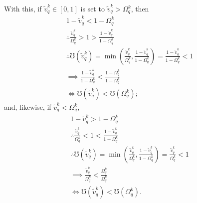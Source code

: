 \documentclass[hidelinks, nonatbib]{elsarticle}
\begin{document}
\begin{enumerate}
    With this, if $\tilde{v}_{q}^{k} \in [0,1]$ is set to $\tilde{v}_{q}^{k} > \Omega_{q}^{k}$, then
    \begin{align}
        1 - \tilde{v}_{q}^{k}
        <
        1 - \Omega_{q}^{k}
        \\
        \therefore
        \frac{
            \tilde{v}_{q}^{k}
        }{
            \Omega_{q}^{k}
        }
        >
        1
        >
        \frac{
            1 - \tilde{v}_{q}^{k}
        }{
            1 - \Omega_{q}^{k}
        }
        \\
        \therefore
        \mho(\tilde{v}_{q}^{k}) 
        =
        \min\left(
            \frac{
                \tilde{v}_{q}^{k}
            }{
                \Omega_{q}^{k}
            }
            ,
            \frac{
                1 - \tilde{v}_{q}^{k}
            }{
                1 - \Omega_{q}^{k}
            }
        \right)
        =
        \frac{
            1 - \tilde{v}_{q}^{k}
        }{
            1 - \Omega_{q}^{k}
        }
        <
        1
        \\
        \implies
        \frac{
            1 - \tilde{v}_{q}^{k}
        }{
            1 - \Omega_{q}^{k}
        }
        <
        \frac{
            1 - \Omega_{q}^{k}
        }{
            1 - \Omega_{q}^{k}
        }
        \\
        \iff
        \mho(\tilde{v}_{q}^{k})
        <
        \mho(\Omega_{q}^{k})
        ;
    \end{align}
    and, likewise, if $\tilde{v}_{q}^{k} < \Omega_{q}^{k}$,
    \begin{align}
        1 - \tilde{v}_{q}^{k}
        >
        1 - \Omega_{q}^{k}
        \\
        \therefore
        \frac{
            \tilde{v}_{q}^{k}
        }{
            \Omega_{q}^{k}
        }
        <
        1
        <
        \frac{
            1 - \tilde{v}_{q}^{k}
        }{
            1 - \Omega_{q}^{k}
        }
        \\
        \therefore
        \mho(\tilde{v}_{q}^{k}) 
        =
        \min\left(
            \frac{
                \tilde{v}_{q}^{k}
            }{
                \Omega_{q}^{k}
            }
            ,
            \frac{
                1 - \tilde{v}_{q}^{k}
            }{
                1 - \Omega_{q}^{k}
            }
        \right)
        =
        \frac{
            \tilde{v}_{q}^{k}
        }{
            \Omega_{q}^{k}
        }
        <
        1
        \\
        \implies
        \frac{
            \tilde{v}_{q}^{k}
        }{
            \Omega_{q}^{k}
        }
        <
        \frac{
            \Omega_{q}^{k}
        }{
            \Omega_{q}^{k}
        }
        \\
        \iff
        \mho(\tilde{v}_{q}^{k})
        <
        \mho(\Omega_{q}^{k})
        .
    \end{align}


\end{enumerate}
\end{document}
